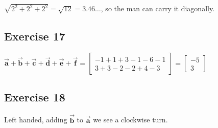 \documentclass[11pt]{article}
\begin{document}
$\sqrt{2^2+2^2+2^2}=\sqrt{12}=3.46\dots{}$, so the man can carry it diagonally.

\subsection{Exercise 17}

$\vec{\textbf{a}}+\vec{\textbf{b}}+\vec{\textbf{c}}+\vec{\textbf{d}}+\vec{\textbf{e}}+\vec{\textbf{f}}=
\begin{bmatrix}
-1 + 1 + 3 -1 - 6 - 1 \\
3 + 3 - 2 - 2 + 4 - 3
\end{bmatrix}=
\begin{bmatrix}
-5 \\
3
\end{bmatrix}$

\subsection{Exercise 18}

Left handed, adding $\vec{\textbf{b}}$ to $\vec{\textbf{a}}$ we see a clockwise turn.
\end{document}

